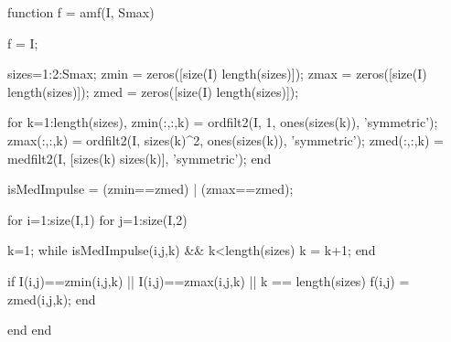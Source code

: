 \begin{matlab}
function f = amf(I, Smax)

f = I;

sizes=1:2:Smax;
zmin = zeros([size(I) length(sizes)]);
zmax = zeros([size(I) length(sizes)]);
zmed = zeros([size(I) length(sizes)]);

for k=1:length(sizes),
    zmin(:,:,k) = ordfilt2(I, 1, ones(sizes(k)), 'symmetric');
    zmax(:,:,k) = ordfilt2(I, sizes(k)^2, ones(sizes(k)), 'symmetric');
    zmed(:,:,k) = medfilt2(I, [sizes(k) sizes(k)], 'symmetric');
end

isMedImpulse = (zmin==zmed) | (zmax==zmed);

for i=1:size(I,1)
    for j=1:size(I,2)
        
        k=1;
        while isMedImpulse(i,j,k) && k<length(sizes)
            k = k+1;
        end
        
        if I(i,j)==zmin(i,j,k) || I(i,j)==zmax(i,j,k) ||  k == length(sizes)
            f(i,j) = zmed(i,j,k);
        end

    end
end
\end{matlab}

